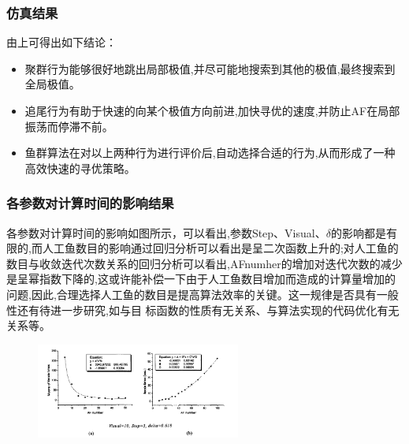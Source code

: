 \begin{frame}
\frametitle{仿真结果}
由上可得出如下结论：
\begin{itemize}
\item{聚群行为能够很好地跳出局部极值,并尽可能地搜索到其他的极值,最终搜索到全局极值。}
\item{追尾行为有助于快速的向某个极值方向前进,加快寻优的速度,并防止AF在局部振荡而停滞不前。}
\item{鱼群算法在对以上两种行为进行评价后,自动选择合适的行为,从而形成了一种高效快速的寻优策略。}
\end{itemize}
\end{frame}

\begin{frame}
\frametitle{各参数对计算时间的影响结果}
\small{各参数对计算时间的影响如图所示，可以看出,参数Step、Visual、$\delta$的影响都是有限的,而人工鱼数目的影响通过回归分析可以看出是呈二次函数上升的;对人工鱼的数目与收敛迭代次数关系的回归分析可以看出,AFnumher的增加对迭代次数的减少是呈幂指数下降的,这或许能补偿一下由于人工鱼数目增加而造成的计算量增加的问题,因此,合理选择人工鱼的数目是提高算法效率的关键。这一规律是否具有一般性还有待进一步研究,如与目
标函数的性质有无关系、与算法实现的代码优化有无关系等。}
\begin{figure}
\centering
\includegraphics[width=0.6\textwidth]{pic/fish6.png}
\end{figure}
\end{frame}

